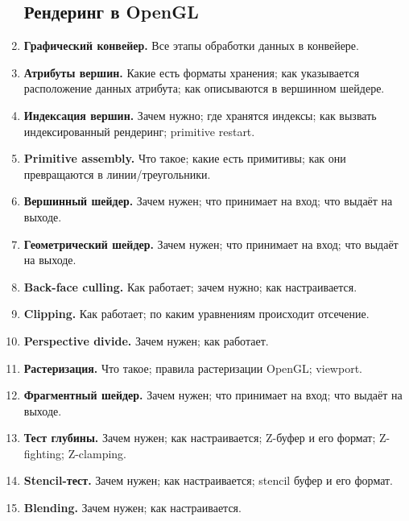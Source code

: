 \documentclass{article}
\begin{document}
\begin{enumerate}
\subsection{Рендеринг в OpenGL}
\item \textbf{Графический конвейер.} Все этапы обработки данных в конвейере.
\item \textbf{Атрибуты вершин.} Какие есть форматы хранения; как указывается расположение данных атрибута; как описываются в вершинном шейдере.
\item \textbf{Индексация вершин.} Зачем нужно; где хранятся индексы; как вызвать индексированный рендеринг; primitive restart.
\item \textbf{Primitive assembly.} Что такое; какие есть примитивы; как они превращаются в линии/треугольники.
\item \textbf{Вершинный шейдер.} Зачем нужен; что принимает на вход; что выдаёт на выходе.
\item \textbf{Геометрический шейдер.} Зачем нужен; что принимает на вход; что выдаёт на выходе.
\item \textbf{Back-face culling.} Как работает; зачем нужно; как настраивается.
\item \textbf{Clipping.} Как работает; по каким уравнениям происходит отсечение.
\item \textbf{Perspective divide.} Зачем нужен; как работает.
\item \textbf{Растеризация.} Что такое; правила растеризации OpenGL; viewport.
\item \textbf{Фрагментный шейдер.} Зачем нужен; что принимает на вход; что выдаёт на выходе.
\item \textbf{Тест глубины.} Зачем нужен; как настраивается; Z-буфер и его формат; Z-fighting; Z-clamping.
\item \textbf{Stencil-тест.} Зачем нужен; как настраивается; stencil буфер и его формат.
\item \textbf{Blending.} Зачем нужен; как настраивается.


\end{enumerate}
\end{document}
